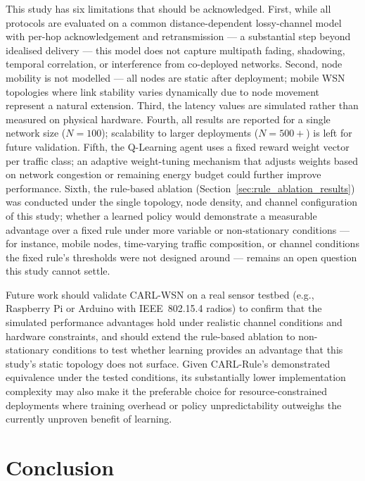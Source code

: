 \documentclass[12pt]{article}
\begin{document}
This study has six limitations that should be acknowledged.
First, while all protocols are evaluated on a common
distance-dependent lossy-channel model with per-hop acknowledgement
and retransmission --- a substantial step beyond idealised
delivery --- this model does not capture multipath fading,
shadowing, temporal correlation, or interference from co-deployed
networks. Second, node mobility is not modelled --- all nodes are static
after deployment; mobile WSN topologies where link stability
varies dynamically due to node movement represent a natural
extension. Third, the latency values are simulated rather than
measured on physical hardware. Fourth, all results are reported
for a single network size ($N = 100$); scalability to larger
deployments ($N = 500{+}$) is left for future validation. Fifth,
the Q-Learning agent uses a fixed reward weight vector per traffic
class; an adaptive weight-tuning mechanism that adjusts weights
based on network congestion or remaining energy budget could
further improve performance. Sixth, the rule-based ablation
(Section~\ref{sec:rule_ablation_results}) was conducted under the
single topology, node density, and channel configuration of this
study; whether a learned policy would demonstrate a measurable
advantage over a fixed rule under more variable or non-stationary
conditions --- for instance, mobile nodes, time-varying traffic
composition, or channel conditions the fixed rule's thresholds were
not designed around --- remains an open question this study cannot
settle.

Future work should validate CARL-WSN on a real sensor testbed
(e.g., Raspberry Pi or Arduino with IEEE~802.15.4 radios) to
confirm that the simulated performance advantages hold under
realistic channel conditions and hardware constraints, and should
extend the rule-based ablation to non-stationary conditions to test
whether learning provides an advantage that this study's static
topology does not surface. Given CARL-Rule's demonstrated
equivalence under the tested conditions, its substantially lower
implementation complexity may also make it the preferable choice for
resource-constrained deployments where training overhead or policy
unpredictability outweighs the currently unproven benefit of
learning.


\section{Conclusion}
\label{sec:conclusion}
\end{document}

